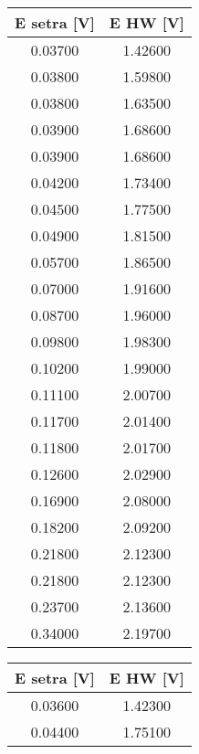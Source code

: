 \begin{table}[H]
    \centering
    \begin{tabular}{|c|c|}
    \hline
    E setra {[}V{]} & E HW {[}V{]} \\ \hline
    0.03700         & 1.42600      \\ \hline
    0.03800         & 1.59800      \\ \hline
    0.03800         & 1.63500      \\ \hline
    0.03900         & 1.68600      \\ \hline
    0.03900         & 1.68600      \\ \hline
    0.04200         & 1.73400      \\ \hline
    0.04500         & 1.77500      \\ \hline
    0.04900         & 1.81500      \\ \hline
    0.05700         & 1.86500      \\ \hline
    0.07000         & 1.91600      \\ \hline
    0.08700         & 1.96000      \\ \hline
    0.09800         & 1.98300      \\ \hline
    0.10200         & 1.99000      \\ \hline
    0.11100         & 2.00700      \\ \hline
    0.11700         & 2.01400      \\ \hline
    0.11800         & 2.01700      \\ \hline
    0.12600         & 2.02900      \\ \hline
    0.16900         & 2.08000      \\ \hline
    0.18200         & 2.09200      \\ \hline
    0.21800         & 2.12300      \\ \hline
    0.21800         & 2.12300      \\ \hline
    0.23700         & 2.13600      \\ \hline
    0.34000         & 2.19700      \\ \hline
    \end{tabular}
    \hspace{1cm}
    \centering
    \begin{tabular}{|c|c|}
    \hline
    E setra {[}V{]} & E HW {[}V{]} \\ \hline
    0.03600         & 1.42300      \\ \hline
    0.04400         & 1.75100      \\ \hline

\end{tabular}
\end{table}
